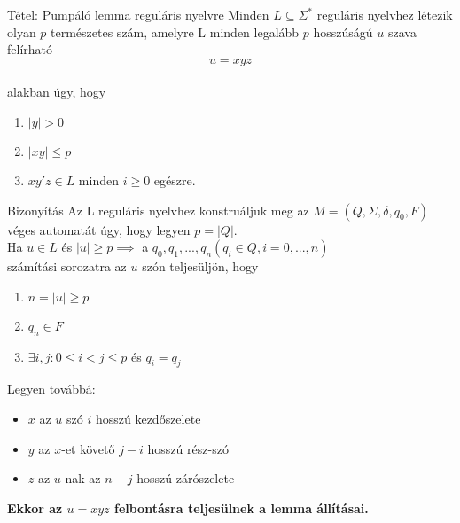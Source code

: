 \documentclass{beamer}
\begin{document}
\begin{frame}
\begin{block}{Tétel: Pumpáló lemma reguláris nyelvre}
Minden $L \subseteq {\Sigma}^*$ reguláris nyelvhez létezik olyan $p$ természetes szám, amelyre L minden legalább $p$ hosszúságú $u$ szava felírható $$u = xyz$$\\
alakban úgy, hogy\\
\begin{enumerate}
\item $|y| > 0$
\item $|xy| \leq p$
\item $xy'z \in L$ minden $i \geq 0$ egészre.
\end{enumerate}

\end{block}

\begin{block}{Bizonyítás}
Az L reguláris nyelvhez konstruáljuk meg az $M = (Q, {\Sigma}, {\delta}, q_0, F)$ véges automatát úgy, hogy legyen $p = |Q|$.\\
Ha $u \in L$ és $|u| \geq p \implies$ a $q_0, q_1, ...,q_n (q_i \in Q, i = 0, ..., n)$\\
számítási sorozatra az $u$ szón teljesüljön, hogy\\
\begin{enumerate}
\item $n = |u| \geq p$
\item $q_n \in F$
\item ${\exists}i, j : 0 \leq i < j \leq p$ és $q_i = q_j$
\end{enumerate}
\bigskip
Legyen továbbá:
\begin{itemize}
\item $x$ az $u$ szó $i$ hosszú kezdőszelete
\item $y$ az $x$-et követő $j - i$ hosszú rész-szó
\item $z$ az $u$-nak az $n - j$ hosszú zárószelete 
\end{itemize}
\bigskip
\textbf{Ekkor az $u = xyz$ felbontásra teljesülnek a lemma állításai.}
\end{block}

\end{frame}
\end{document}
